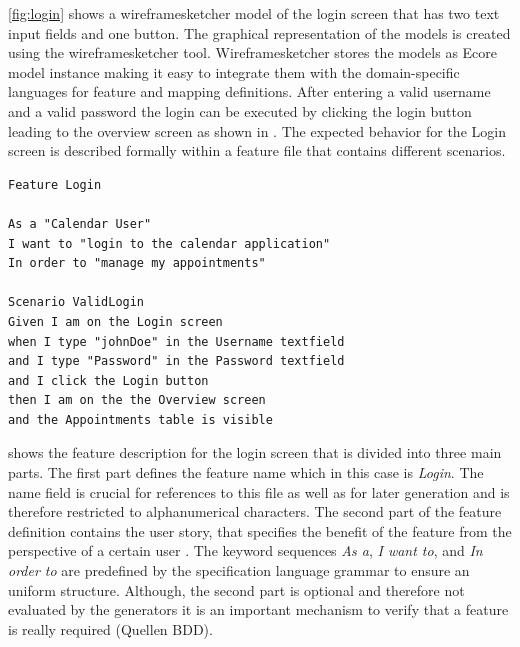 \documentclass{sig-alternate-05-2015}
\begin{document}
\cref{fig:login} shows a wireframesketcher model of the login screen that has two text input fields and one button.
The graphical representation of the models is created using the wireframesketcher tool.
Wireframesketcher stores the models as Ecore model instance making it easy to integrate them with the domain-specific languages for feature and mapping definitions.
After entering a valid username and a valid password the login can be executed by clicking the login button leading to the overview screen as shown in .
The expected behavior for the Login screen is described formally within a feature file that contains different scenarios.

\begin{lstlisting}[captionpos=b, caption=Feature Description: Login Screen., label={lst:featureLogin}, language=dsl]
Feature Login

As a "Calendar User"
I want to "login to the calendar application"
In order to "manage my appointments"

Scenario ValidLogin
Given I am on the Login screen 
when I type "johnDoe" in the Username textfield 
and I type "Password" in the Password textfield 
and I click the Login button
then I am on the the Overview screen
and the Appointments table is visible
\end{lstlisting}

 shows the feature description for the login screen that is divided into three main parts. 
The first part defines the feature name which in this case is \textit{Login}.
The name field is crucial for references to this file as well as for later generation and is therefore restricted to alphanumerical characters.
The second part of the feature definition contains the user story, that specifies the benefit of the feature from the perspective of a certain user \cite{C.Solis.2011}.
The keyword sequences \textit{As a}, \textit{I want to}, and \textit{In order to} are predefined by the specification language grammar to ensure an uniform structure.
Although, the second part is optional and therefore not evaluated by the generators it is an important mechanism to verify that a feature is really required (Quellen BDD).
\end{document}
